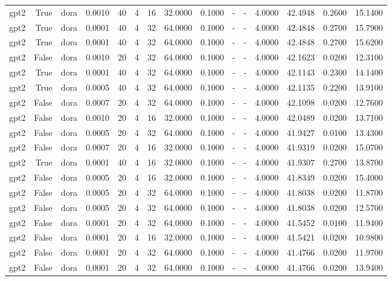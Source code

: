 \begin{tabular}{lrlrrrrrrlllrrr}
gpt2 & True & dora & 0.0010 & 40 & 4 & 16 & 32.0000 & 0.1000 & - & - & 4.0000 & 42.4948 & 0.2600 & 15.1400 \\
gpt2 & True & dora & 0.0001 & 40 & 4 & 32 & 64.0000 & 0.1000 & - & - & 4.0000 & 42.4848 & 0.2700 & 15.7900 \\
gpt2 & True & dora & 0.0001 & 40 & 4 & 32 & 64.0000 & 0.1000 & - & - & 4.0000 & 42.4848 & 0.2700 & 15.6200 \\
gpt2 & False & dora & 0.0010 & 20 & 4 & 32 & 64.0000 & 0.1000 & - & - & 4.0000 & 42.1623 & 0.0200 & 12.3100 \\
gpt2 & True & dora & 0.0001 & 40 & 4 & 32 & 64.0000 & 0.1000 & - & - & 4.0000 & 42.1143 & 0.2300 & 14.1400 \\
gpt2 & True & dora & 0.0005 & 40 & 4 & 32 & 64.0000 & 0.1000 & - & - & 4.0000 & 42.1135 & 0.2200 & 13.9100 \\
gpt2 & False & dora & 0.0007 & 20 & 4 & 32 & 64.0000 & 0.1000 & - & - & 4.0000 & 42.1098 & 0.0200 & 12.7600 \\
gpt2 & False & dora & 0.0010 & 20 & 4 & 16 & 32.0000 & 0.1000 & - & - & 4.0000 & 42.0489 & 0.0200 & 13.7100 \\
gpt2 & False & dora & 0.0005 & 20 & 4 & 32 & 64.0000 & 0.1000 & - & - & 4.0000 & 41.9427 & 0.0100 & 13.4300 \\
gpt2 & False & dora & 0.0007 & 20 & 4 & 16 & 32.0000 & 0.1000 & - & - & 4.0000 & 41.9319 & 0.0200 & 15.0700 \\
gpt2 & True & dora & 0.0001 & 40 & 4 & 16 & 32.0000 & 0.1000 & - & - & 4.0000 & 41.9307 & 0.2700 & 13.8700 \\
gpt2 & False & dora & 0.0005 & 20 & 4 & 16 & 32.0000 & 0.1000 & - & - & 4.0000 & 41.8349 & 0.0200 & 15.4000 \\
gpt2 & False & dora & 0.0005 & 20 & 4 & 32 & 64.0000 & 0.1000 & - & - & 4.0000 & 41.8038 & 0.0200 & 11.8700 \\
gpt2 & False & dora & 0.0005 & 20 & 4 & 32 & 64.0000 & 0.1000 & - & - & 4.0000 & 41.8038 & 0.0200 & 12.5700 \\
gpt2 & False & dora & 0.0001 & 20 & 4 & 32 & 64.0000 & 0.1000 & - & - & 4.0000 & 41.5452 & 0.0100 & 11.9400 \\
gpt2 & False & dora & 0.0001 & 20 & 4 & 16 & 32.0000 & 0.1000 & - & - & 4.0000 & 41.5421 & 0.0200 & 10.9800 \\
gpt2 & False & dora & 0.0001 & 20 & 4 & 32 & 64.0000 & 0.1000 & - & - & 4.0000 & 41.4766 & 0.0200 & 11.9700 \\
gpt2 & False & dora & 0.0001 & 20 & 4 & 32 & 64.0000 & 0.1000 & - & - & 4.0000 & 41.4766 & 0.0200 & 13.9400 \\

\end{tabular}
